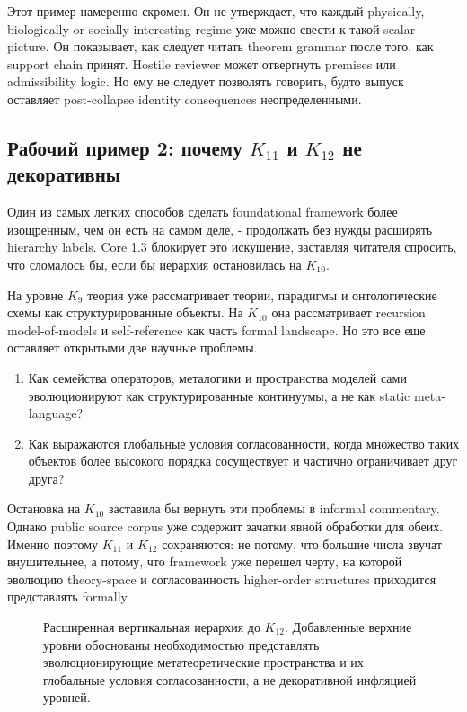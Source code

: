 Этот пример намеренно скромен. Он не утверждает, что каждый physically,
biologically or socially interesting regime уже можно свести к такой
scalar picture. Он показывает, как следует читать theorem grammar после того,
как support chain принят. Hostile reviewer может отвергнуть premises или
admissibility logic. Но ему не следует позволять говорить, будто выпуск
оставляет post-collapse identity consequences неопределенными.

\subsection{Рабочий пример 2: почему \texorpdfstring{$K_{11}$}{K11} и \texorpdfstring{$K_{12}$}{K12} не декоративны}

Один из самых легких способов сделать foundational framework более
изощренным, чем он есть на самом деле, - продолжать без нужды расширять
hierarchy labels. Core 1.3 блокирует это искушение, заставляя читателя
спросить, что сломалось бы, если бы иерархия остановилась на \(K_{10}\).

На уровне \(K_9\) теория уже рассматривает теории, парадигмы и
онтологические схемы как структурированные объекты. На \(K_{10}\) она
рассматривает recursion model-of-models и self-reference как часть formal
landscape. Но это все еще оставляет открытыми две научные проблемы.

\begin{enumerate}
\item Как семейства операторов, металогики и пространства моделей сами
      эволюционируют как структурированные континуумы, а не как static
      meta-language?
\item Как выражаются глобальные условия согласованности, когда множество
      таких объектов более высокого порядка сосуществует и частично
      ограничивает друг друга?
\end{enumerate}

Остановка на \(K_{10}\) заставила бы вернуть эти проблемы в informal
commentary. Однако public source corpus уже содержит зачатки явной обработки
для обеих. Именно поэтому \(K_{11}\) и \(K_{12}\) сохраняются: не потому,
что большие числа звучат внушительнее, а потому, что framework уже перешел
черту, на которой эволюцию theory-space и согласованность higher-order
structures приходится представлять formally.

\begin{figure}[htbp]
\centering

\caption{Расширенная вертикальная иерархия до \(K_{12}\). Добавленные верхние
уровни обоснованы необходимостью представлять эволюционирующие
метатеоретические пространства и их глобальные условия согласованности, а не
декоративной инфляцией уровней.}
\label{fig:oc13-levels-k12}
\end{figure}

